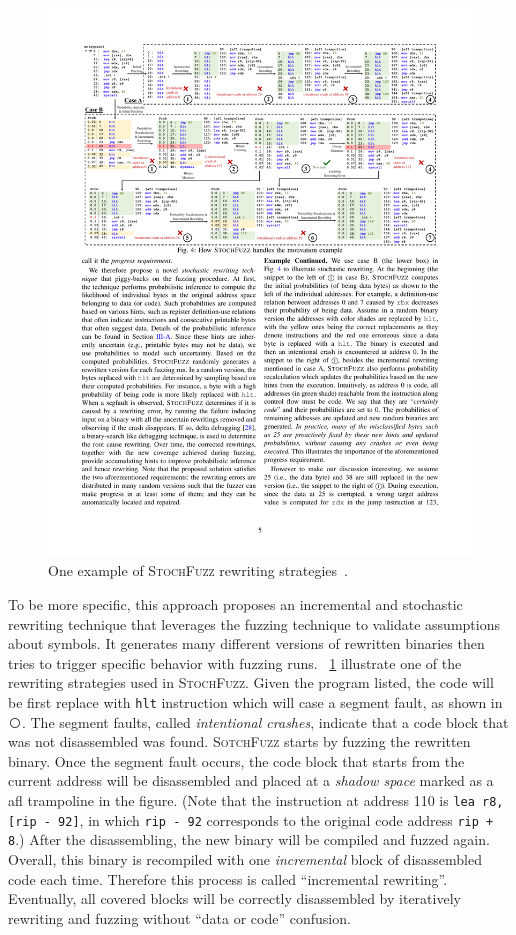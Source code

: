\begin{figure}[tb]
  \centering
  \includegraphics[width=1.0\textwidth]{fig/STOCHFUZZ.pdf}
  \caption{One example of \textsc{StochFuzz} rewriting strategies~\cite{zhang2021stochfuzz}.}
  \label{fig:stochfuzz}
\end{figure}

To be more specific, this approach proposes an incremental and stochastic rewriting technique that leverages the fuzzing technique to validate assumptions about symbols. It generates many different versions of rewritten binaries then tries to trigger specific behavior with fuzzing runs.
%
\F~\ref{fig:stochfuzz} illustrate one of the rewriting strategies used in \textsc{StochFuzz}. Given the program listed, the code will be first replace with \texttt{hlt} instruction which will case a segment fault, as shown in \textcircled{}. The segment faults, called \textit{intentional crashes}, indicate that a code block that was not disassembled was found. \textsc{SotchFuzz} starts by fuzzing the rewritten binary. Once the segment fault occurs, the code block that starts from the current address will be disassembled and placed at a \textit{shadow space} marked as a afl trampoline in the figure. (Note that the instruction at address 110 is \texttt{lea r8, [rip - 92]}, in which \texttt{rip - 92} corresponds to the original code address \texttt{rip + 8}.) After the disassembling, the new binary will be compiled and fuzzed again. Overall, this binary is recompiled with one \textit{incremental} block of disassembled code each time. Therefore this process is called ``incremental rewriting''. Eventually, all covered blocks will be correctly disassembled by iteratively rewriting and fuzzing without ``data or code'' confusion.
